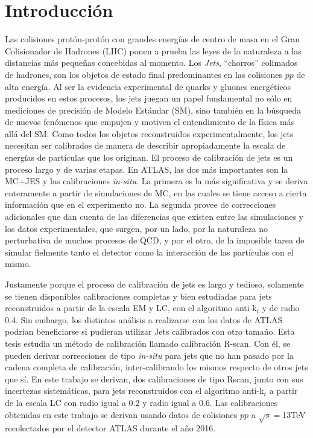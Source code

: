 \chapter{Introducción}

Las colisiones protón-protón con grandes energías de centro de masa en el Gran Colisionador de Hadrones (LHC) ponen a prueba las leyes de la naturaleza a las distancias más pequeñas concebidas al momento. Los \textit{Jets}, ``chorros'' colimados de hadrones, son los objetos de estado final predominantes en las colisiones $pp$ de alta energía. Al ser la evidencia experimental de quarks y gluones energéticos producidos en estos procesos, los jets juegan un papel fundamental no sólo en mediciones de precisión de Modelo Estándar (SM), sino también en la búsqueda de nuevos fenómenos que empujen y motiven el entendimiento de la física más allá del SM. Como todos los objetos reconstruidos experimentalmente, los jets necesitan ser calibrados de manera de describir apropiadamente la escala de energías de partículas que los originan. El proceso de calibración de jets es un proceso largo y de varias etapas. En ATLAS, las dos más importantes son la MC+JES y las calibraciones \textit{in-situ}. La primera es la más significativa y se deriva enteramente a partir de simulaciones de MC, en las cuales se tiene acceso a cierta información que en el experimento no. La segunda provee de correcciones adicionales que dan cuenta de las diferencias que existen entre las simulaciones y los datos experimentales, que surgen, por un lado, por la naturaleza no perturbativa de muchos procesos de QCD, y por el otro, de la imposible tarea de simular fielmente tanto el detector como la interacción de las partículas con el mismo.     

Justamente porque el proceso de calibración de jets es largo y tedioso, solamente se tienen disponibles calibraciones completas y bien estudiadas para jets reconstruidos a partir de la escala EM y LC, con el algoritmo anti-k$_t$ y de radio 0.4. Sin embargo, los distintos análisis a realizarse con los datos de ATLAS podrían beneficiarse si pudieran utilizar Jets calibrados con otro tamaño. Esta tesis estudia un método de calibración llamado calibración R-scan. Con él, se pueden derivar correcciones de tipo \textit{in-situ} para jets que no han pasado por la cadena completa de calibración, inter-calibrando los mismos respecto de otros jets que sí. En este trabajo se derivan, dos calibraciones de tipo Rscan, junto con sus incertezas sistemáticas, para jets reconstruidos con el algoritmo anti-k$_t$ a partir de la escala LC con radio igual a 0.2 y radio igual a 0.6. 
Las calibraciones obtenidas en este trabajo se derivan usando datos de colisiones $pp$ a $\sqrt{s}=$13TeV recolectados por el detector ATLAS durante el año 2016.

